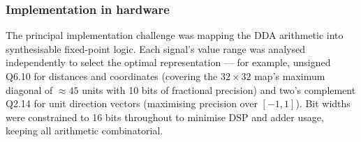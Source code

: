 



\subsubsection{Implementation in hardware}


The principal implementation challenge was mapping the DDA arithmetic into synthesisable fixed-point logic. Each signal's value range was analysed independently to select the optimal representation — for example, unsigned Q6.10 for distances and coordinates (covering the $32\times32$ map's maximum diagonal of $\approx45$ units with 10 bits of fractional precision) and two's complement Q2.14 for unit direction vectors (maximising precision over $[-1,1]$). Bit widths were constrained to 16 bits throughout to minimise DSP and adder usage, keeping all arithmetic combinatorial.

